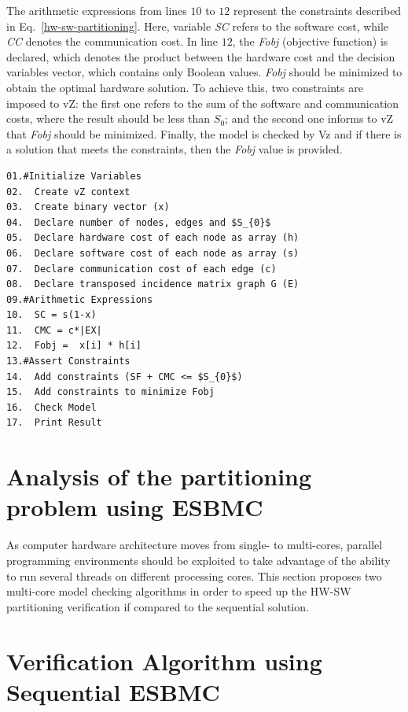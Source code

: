 The arithmetic expressions from lines $10$ to $12$ represent the constraints described in Eq.~\ref{hw-sw-partitioning}. Here, variable \textit{SC} refers to the software cost, while \textit{CC} denotes the communication cost. In line $12$, the \textit{Fobj} (objective function) is declared, which denotes the product between the hardware cost and the decision variables vector, which contains only Boolean values. \textit{Fobj} should be minimized to obtain the optimal hardware solution. To achieve this, two constraints are imposed to vZ: the first one refers to the sum of the software and communication costs, where the result should be less than $S_0$; and the second one informs to vZ that \textit{Fobj} should be minimized. Finally, the model is checked by Vz and if there is a solution that meets the constraints, then the \textit{Fobj} value is provided.

\begin{lstlisting}[caption=Pseudocode describing vZ,label=vZ-pseudocode, mathescape]
01.#Initialize Variables
02.  Create vZ context 
03.  Create binary vector (x)
04.  Declare number of nodes, edges and $S_{0}$
05.  Declare hardware cost of each node as array (h) 
06.  Declare software cost of each node as array (s)
07.  Declare communication cost of each edge (c)
08.  Declare transposed incidence matrix graph G (E)
09.#Arithmetic Expressions
10.  SC = s(1-x)
11.  CMC = c*|EX|
12.  Fobj =  x[i] * h[i]
13.#Assert Constraints
14.  Add constraints (SF + CMC <= $S_{0}$)
15.  Add constraints to minimize Fobj
16.  Check Model
17.  Print Result
\end{lstlisting}

\section{Analysis of the partitioning problem using ESBMC}
\label{Analysis-of-the-partitioning-problem-using-ESBMC}

As computer hardware architecture moves from single- to multi-cores, parallel programming environments should be exploited to take advantage of the ability to run several threads on different processing cores. This section proposes two multi-core model checking algorithms in order to speed up the HW-SW partitioning verification if compared to the sequential solution.

\section{Verification Algorithm using Sequential ESBMC}
\label{Verification-Algorithm-using-ESBMC}

